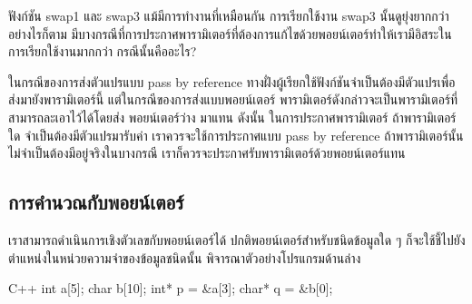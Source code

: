 \begin{quiz}{}
ฟังก์ชัน {\ct swap1} และ {\ct swap3} แม้{\wbr}มี{\wbr}การ{\wbr}ทำงาน{\wbr}ที่{\wbr}เหมือน{\wbr}กัน การ{\wbr}เรียก{\wbr}ใช้งาน{\wbr}
{\ct swap3} นั้น{\wbr}ดู{\wbr}ยุ่งยาก{\wbr}กว่า อย่างไร{\wbr}ก็{\wbr}ตาม{\wbr}
มี{\wbr}บาง{\wbr}กรณี{\wbr}ที่{\wbr}การ{\wbr}ประกาศ{\wbr}พารามิเตอร์{\wbr}ที่{\wbr}ต้องการ{\wbr}แก้ไข{\wbr}ด้วย{\wbr}พอยน์เตอร์{\wbr}ทำให้{\wbr}เรา{\wbr}มี{\wbr}อิสระ{\wbr}ใน{\wbr}การ{\wbr}เรียก{\wbr}ใช้งาน{\wbr}มาก{\wbr}กว่า กรณี{\wbr}นั้น{\wbr}คือ{\wbr}อะไร?
\end{quiz}
\begin{quizans}
ใน{\wbr}กรณี{\wbr}ของ{\wbr}การ{\wbr}ส่ง{\wbr}ตัวแปร{\wbr}แบบ pass by reference
ทาง{\wbr}ฝั่ง{\wbr}ผู้{\wbr}เรียก{\wbr}ใช้{\wbr}ฟังก์ชัน{\wbr}จำเป็น{\wbr}ต้อง{\wbr}มี{\wbr}ตัวแปร{\wbr}เพื่อ{\wbr}ส่ง{\wbr}มา{\wbr}ยัง{\wbr}พารามิเตอร์{\wbr}นี้{\wbr}
แต่{\wbr}ใน{\wbr}กรณี{\wbr}ของ{\wbr}การ{\wbr}ส่ง{\wbr}แบบ{\wbr}พอยน์เตอร์
พารามิเตอร์{\wbr}ดัง{\wbr}กล่าว{\wbr}จะ{\wbr}เป็น{\wbr}พารามิเตอร์{\wbr}ที่{\wbr}สามารถ{\wbr}ละ{\wbr}เอา{\wbr}ไว้{\wbr}ได้{\wbr}โดย{\wbr}ส่ง พอยน์เตอร์ว่าง {}
มา{\wbr}แทน ดังนั้น ใน{\wbr}การ{\wbr}ประกาศ{\wbr}พารามิเตอร์ ถ้า{\wbr}พารามิเตอร์{\wbr}ใด จำเป็น{\wbr}ต้อง{\wbr}มี{\wbr}ตัวแปร{\wbr}มา{\wbr}รับ{\wbr}ค่า{\wbr}
เรา{\wbr}ควร{\wbr}จะ{\wbr}ใช้{\wbr}การ{\wbr}ประกาศ{\wbr}แบบ pass by reference
ถ้า{\wbr}พารามิเตอร์{\wbr}นั้น{\wbr}ไม่{\wbr}จำเป็น{\wbr}ต้อง{\wbr}มี{\wbr}อยู่{\wbr}จริง{\wbr}ใน{\wbr}บาง{\wbr}กรณี{\wbr}
เรา{\wbr}ก็{\wbr}ควร{\wbr}จะ{\wbr}ประกาศ{\wbr}รับ{\wbr}พารามิเตอร์{\wbr}ด้วย{\wbr}พอยน์เตอร์{\wbr}แทน{\wbr}
\end{quizans}

\subsection{การ{\wbr}คำนวณ{\wbr}กับ{\wbr}พอยน์เตอร์}
\label{sect:array-pointer-arith}

เรา{\wbr}สามารถ{\wbr}ดำเนิน{\wbr}การ{\wbr}เชิง{\wbr}ตัวเลข{\wbr}กับ{\wbr}พอยน์เตอร์{\wbr}ได้ ปกติ{\wbr}พอยน์เตอร์{\wbr}สำหรับ{\wbr}ชนิด{\wbr}ข้อมูล{\wbr}ใด ๆ
ก็{\wbr}จะ{\wbr}ใช้{\wbr}ชี้{\wbr}ไป{\wbr}ยัง{\wbr}ตำแหน่ง{\wbr}ใน{\wbr}หน่วย{\wbr}ความ{\wbr}จำ{\wbr}ของ{\wbr}ข้อมูล{\wbr}ชนิด{\wbr}นั้น พิจารณา{\wbr}ตัวอย่าง{\wbr}โปรแกรม{\wbr}ด้าน{\wbr}ล่าง{\wbr}

\latintext
\begin{codelist}{C++}{}
int a[5];
char b[10];
int* p = &a[3];
char* q = &b[0];
\end{codelist}
\thaitext

